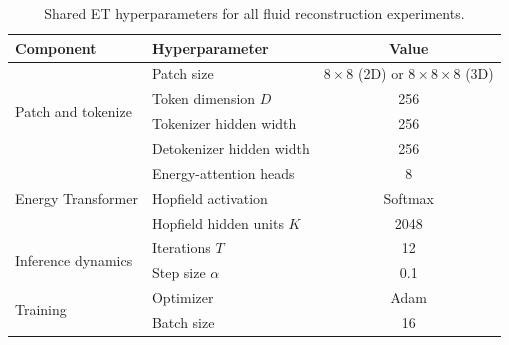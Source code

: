 \begin{table}[htbp]
  \centering
  \caption{Shared ET hyperparameters for all fluid reconstruction experiments.}
  \label{tab:et:hyperparameters}
  \begin{tabular}{llc}
    \toprule
    Component & Hyperparameter & Value \\
    \midrule
    \multirow{4}{*}{Patch and tokenize} & Patch size & $8 \times 8$ (2D) or $8 \times 8 \times 8$ (3D) \\
    & Token dimension $D$ & 256 \\
    & Tokenizer hidden width & 256 \\
    & Detokenizer hidden width & 256 \\
    \midrule
    \multirow{3}{*}{Energy Transformer} & Energy-attention heads & 8 \\
    & Hopfield activation & Softmax \\
    & Hopfield hidden units $K$ & 2048 \\
    \midrule
    \multirow{2}{*}{Inference dynamics} & Iterations $T$ & 12 \\
    & Step size $\alpha$ & 0.1 \\
    \midrule
    \multirow{2}{*}{Training} & Optimizer & Adam \\
    & Batch size & 16 \\
    \bottomrule
  \end{tabular}
\end{table}
